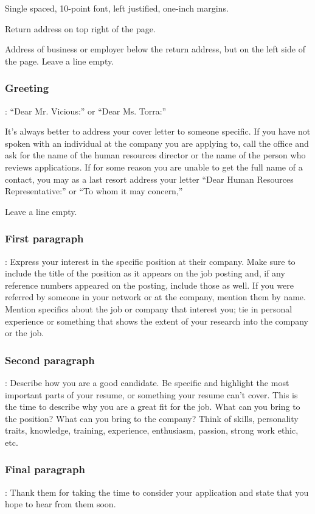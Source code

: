 Single spaced, 10-point font, left justified, one-inch margins.

Return address on top right of the page.

Address of business or employer below the return address, but on the left side of the page. Leave a line empty.

\subsubsection*{Greeting}: ``Dear Mr. Vicious:'' or ``Dear Ms. Torra:''

It's always better to address your cover letter to someone specific. If you have not spoken with an individual at the company you are applying to, call the office and ask for the name of the human resources director or the name of the person who reviews applications. If for some reason you are unable to get the full name of a contact, you may as a last resort address your letter ``Dear Human Resources Representative:'' or ``To whom it may concern,''

Leave a line empty.

\subsubsection*{First paragraph}: Express your interest in the specific position at their company. Make sure to include the title of the position as it appears on the job posting and, if any reference numbers appeared on the posting, include those as well. If you were referred by someone in your network or at the company, mention them by name. Mention specifics about the job or company that interest you; tie in personal experience or something that shows the extent of your research into the company or the job.

\subsubsection*{Second paragraph}: Describe how you are a good candidate. Be specific and highlight the most important parts of your resume, or something your resume can't cover. This is the time to describe why you are a great fit for the job. What can you bring to the position? What can you bring to the company? Think of skills, personality traits, knowledge, training, experience, enthusiasm, passion, strong work ethic, etc.

\subsubsection*{Final paragraph}: Thank them for taking the time to consider your application and state that you hope to hear from them soon.

